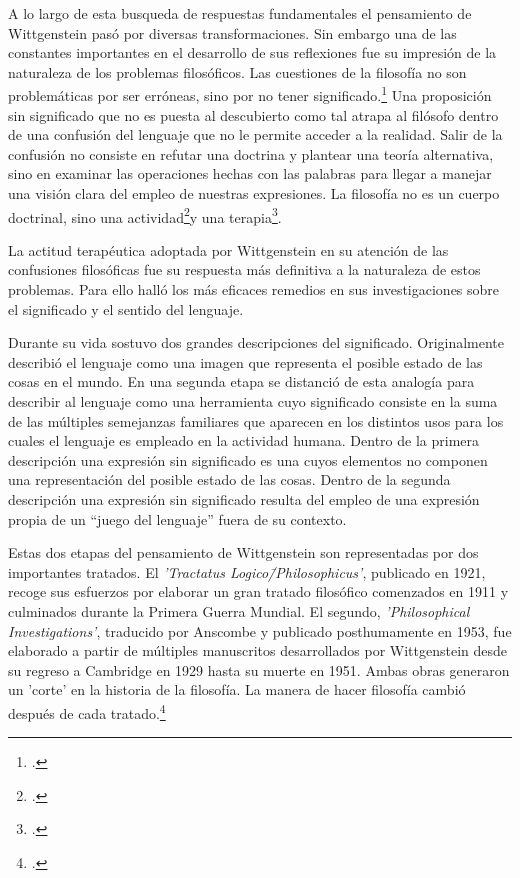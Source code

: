     A lo largo de esta busqueda de respuestas fundamentales el pensamiento de
    Wittgenstein pasó por diversas transformaciones. Sin embargo una de las
    constantes importantes en el desarrollo de sus reflexiones fue su impresión de
    la naturaleza de los problemas filosóficos.
    Las cuestiones de la filosofía no son problemáticas por ser erróneas, sino por
    no tener significado.\footcite[cf.~][4.003]{tractatus} Una proposición sin
    significado que no es puesta al descubierto como tal
    atrapa al filósofo dentro de una confusión del lenguaje que no le permite
    acceder a la realidad. Salir de la confusión no consiste en refutar una doctrina
    y plantear una teoría alternativa, sino en examinar las operaciones hechas con
    las palabras para llegar a manejar una visión clara del empleo de nuestras
    expresiones. La filosofía no es un cuerpo doctrinal, sino una
    actividad\footcite[cf.~][4.112]{tractatus}y una
    terapia\footcite[cf.~][\S133]{PI}.   

    La actitud terapéutica adoptada por Wittgenstein en su atención de las
    confusiones filosóficas fue su respuesta más definitiva a la naturaleza de estos
    problemas. Para ello halló los más eficaces remedios en sus investigaciones sobre el
    significado y el sentido del lenguaje.

    Durante su vida sostuvo dos grandes descripciones del significado.
    Originalmente describió el lenguaje como una imagen que representa el posible
    estado de las cosas en el mundo.
    En una segunda etapa se distanció de esta analogía para describir al lenguaje
    como una herramienta cuyo significado consiste en la suma de las múltiples
    semejanzas familiares que aparecen en los distintos usos para los cuales el
    lenguaje es empleado en la actividad humana.
    Dentro de la primera descripción una expresión sin significado es una cuyos
    elementos no componen una representación del posible estado de las cosas.
    Dentro de la segunda descripción una expresión sin significado resulta del
    empleo de una expresión propia de un ``juego del lenguaje'' fuera de su
    contexto. 

    Estas dos etapas del pensamiento de Wittgenstein 
    son representadas por dos importantes tratados. 
    El \emph{'Tractatus Logico\=/Philosophicus'}, publicado en 1921, recoge sus
    esfuerzos por elaborar un gran tratado filosófico comenzados en 1911 y
    culminados durante la Primera Guerra Mundial. El segundo, \emph{'Philosophical 
        Investigations'}, traducido por Anscombe y publicado posthumamente en 1953,
    fue elaborado a partir de múltiples manuscritos desarrollados por Wittgenstein
    desde su regreso a Cambridge en 1929 hasta su muerte en 1951. 
    Ambas obras generaron un 'corte' en la historia de la filosofía. La manera de
    hacer filosofía cambió después de cada tratado.\footcite[cf.~][p.~181]{twocuts}

